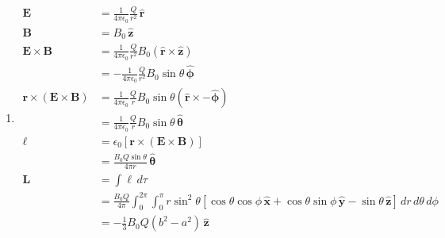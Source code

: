 \documentclass{article}
\renewcommand{\vec}[1]{\boldsymbol{\mathbf{#1}}}
\newcommand{\uvec}[1]{\hat{\vec{#1}}}
\newcommand{\ke}{\frac{1}{4 \pi \epsilon_0}}
\begin{document}
\begin{enumerate}
  \item

        \begin{align*}
          \vec{E}                                 & = \ke \frac{Q}{r^2} \,\uvec{r}                                                                                                                                                           \\
          \vec{B}                                 & = B_0 \,\uvec{z}                                                                                                                                                                         \\
          \vec{E} \times \vec{B}                  & = \ke \frac{Q}{r^2} B_0 (\uvec{r} \times \uvec{z})                                                                                                                                       \\
                                                  & = -\ke \frac{Q}{r^2} B_0 \sin \theta \,\uvec{\phi}                                                                                                                                       \\
          \vec{r} \times (\vec{E} \times \vec{B}) & = \ke \frac{Q}{r} B_0 \sin \theta (\uvec{r} \times -\uvec{\phi})                                                                                                                         \\
                                                  & = \ke \frac{Q}{r} B_0 \sin \theta \,\uvec{\theta}                                                                                                                                        \\
          \ell                                    & = \epsilon_0 [\vec{r} \times (\vec{E} \times \vec{B})]                                                                                                                                   \\
                                                  & = \frac{B_0 Q \sin \theta}{4 \pi r} \,\uvec{\theta}                                                                                                                                      \\
          \vec{L}                                 & = \int \ell \,d \tau                                                                                                                                                                     \\
                                                  & = \frac{B_0 Q}{4 \pi} \int_0^{2 \pi} \int_0^\pi r \sin^2 \theta [\cos \theta \cos \phi \,\uvec{x} + \cos \theta \sin \phi \,\uvec{y} - \sin \theta \,\uvec{z}] \,d r \,d \theta \,d \phi \\
                                                  & = -\frac{1}{3} B_0 Q (b^2 - a^2) \,\uvec{z}
        \end{align*}


\end{enumerate}
\end{document}
